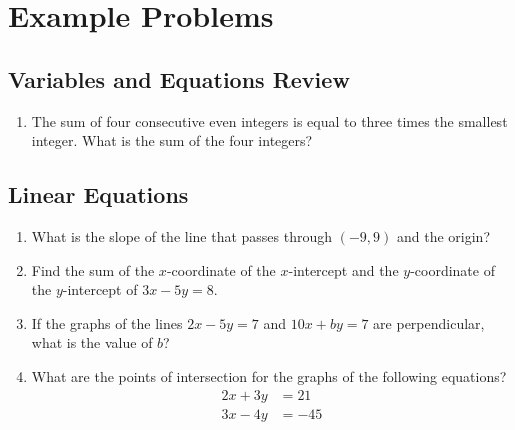 \documentclass{article}
\begin{document}
    \section*{Example Problems}
    \subsection*{Variables and Equations Review}
    \begin{enumerate}
        \item The sum of four consecutive even integers is equal to three times
        the smallest integer. What is the sum of the four integers?
        \vspace{3cm}
    \end{enumerate}
    \subsection*{Linear Equations}
    \begin{enumerate}[resume]
        \item What is the slope of the line that passes through $(-9, 9)$ and
        the origin?
        \vspace{3cm}
        \item Find the sum of the $x$-coordinate of the $x$-intercept and the
        $y$-coordinate of the $y$-intercept of $3x - 5y = 8$.
        \vspace{3cm}
        \item If the graphs of the lines $2x - 5y = 7$ and $10x + by = 7$ are
        perpendicular, what is the value of $b$?
        \vspace{3cm}
        \item What are the points of intersection for the graphs of the
        following equations?
        \begin{align*}
            2x + 3y & = 21 \\
            3x - 4y & = -45
        \end{align*}
        \vspace{3cm}
    \end{enumerate}
\end{document}

